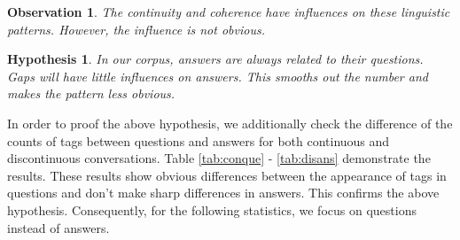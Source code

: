 \documentclass[bsc,frontabs,twoside,singlespacing,parskip,deptreport]{infthesis}     %
\newtheorem{observation}{Observation}[chapter]
\newtheorem{hypo}{Hypothesis}[chapter]
\begin{document}
\begin{observation}
The continuity and coherence have influences on these linguistic patterns. However, the influence is not obvious.
\end{observation} 

\begin{hypo}
In our corpus, answers are always related to their questions. Gaps will have little influences on answers. This smooths out the number and makes the pattern less obvious.
\end{hypo}

In order to proof the above hypothesis, we additionally check the difference of the counts of tags between questions and answers for both continuous and discontinuous conversations. Table \ref{tab:conque} - \ref{tab:disans} demonstrate the results. These results show obvious differences between the appearance of tags in questions and don't make sharp differences in answers. This confirms the above hypothesis. Consequently, for the following statistics, we focus on questions instead of answers.
\end{document}
